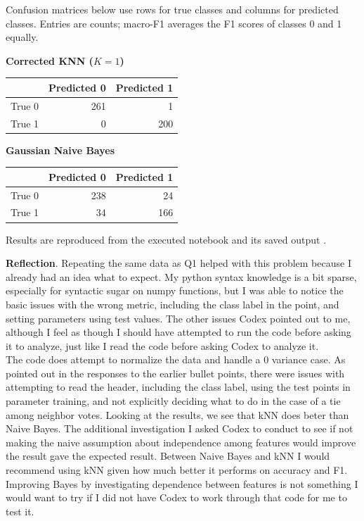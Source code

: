 \documentclass[12pt]{article}
\begin{document}
\begin{enumerate}
\noindent Confusion matrices below use rows for true classes and columns for
predicted classes. Entries are counts; macro-F1 averages the F1 scores of
classes 0 and 1 equally.

\begin{center}
\begin{minipage}{0.48\linewidth}
\centering
\textbf{Corrected KNN ($K=1$)}\par\medskip
\begin{tabular}{lrr}
\hline
 & Predicted 0 & Predicted 1 \\
\hline
True 0 & 261 & 1 \\
True 1 & 0 & 200 \\
\hline
\end{tabular}
\end{minipage}\hfill
\begin{minipage}{0.48\linewidth}
\centering
\textbf{Gaussian Naive Bayes}\par\medskip
\begin{tabular}{lrr}
\hline
 & Predicted 0 & Predicted 1 \\
\hline
True 0 & 238 & 24 \\
True 1 & 34 & 166 \\
\hline
\end{tabular}
\end{minipage}
\end{center}

\noindent Results are reproduced from the executed notebook
 and its saved output
.

\textbf{Reflection}. Repeating the same data as Q1 helped with this problem because I already had an idea what to expect. My python syntax knowledge is a bit sparse, especially for syntactic sugar on numpy functions, but
I was able to notice the basic issues with the wrong metric, including the class label in the point, and setting parameters using test values. The other issues Codex pointed out to me, although I feel as though I should have attempted to run
the code before asking it to analyze, just like I read the code before asking Codex to analyze it.\\

The code does attempt to normalize the data and handle a 0 variance case. As pointed out in the responses to the earlier bullet points, there were issues with attempting to read the header, including the class label, using the test points in parameter training, and not explicitly deciding what to do in the case
of a tie among neighbor votes. Looking at the results, we see that kNN does beter than Naive Bayes. The additional investigation I asked Codex to conduct to see if not making the naive assumption about independence among features would improve the result gave the 
expected result. Between Naive Bayes and kNN I would recommend using kNN given how much better it performs on accuracy and F1. Improving Bayes by investigating dependence between features is not something I would want to try if I did not have Codex to work through that code for me to test it.\\


\end{enumerate}
\end{document}
